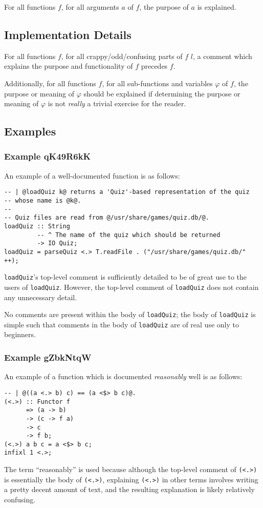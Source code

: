 \documentclass{report}
\begin{document}
For all functions $f$, for all arguments $a$ of $f$, the purpose of $a$ is explained.
\subsection{Implementation Details}
For all functions $f$, for all crappy/odd/confusing parts of $f$ $l$, a comment which explains the purpose and functionality of $f$ precedes $f$.

Additionally, for all functions $f$, for all sub-functions and variables $\varphi$ of $f$, the purpose or meaning of $\varphi$ should be explained if determining the purpose or meaning of $\varphi$ is not \textit{really} a trivial exercise for the reader.
\subsection{Examples}
\subsubsection{Example qK49R6kK}
An example of a well-documented function is as follows:
\lstset{style=customhaskell}
\begin{lstlisting}
-- | @loadQuiz k@ returns a 'Quiz'-based representation of the quiz
-- whose name is @k@.
--
-- Quiz files are read from @/usr/share/games/quiz.db/@.
loadQuiz :: String
         -- ^ The name of the quiz which should be returned
         -> IO Quiz;
loadQuiz = parseQuiz <.> T.readFile . ("/usr/share/games/quiz.db/" ++);
\end{lstlisting}
\texttt{loadQuiz}'s top-level comment is sufficiently detailed to be of great use to the users of \texttt{loadQuiz}.  However, the top-level comment of \texttt{loadQuiz} does not contain any unnecessary detail.

No comments are present within the body of \texttt{loadQuiz}; the body of \texttt{loadQuiz} is simple such that comments in the body of \texttt{loadQuiz} are of real use only to beginners.
\subsubsection{Example gZbkNtqW}
An example of a function which is documented \textit{reasonably} well is as follows:
\begin{lstlisting}
-- | @((a <.> b) c) == (a <$> b c)@.
(<.>) :: Functor f
      => (a -> b)
      -> (c -> f a)
      -> c
      -> f b;
(<.>) a b c = a <$> b c;
infixl 1 <.>;
\end{lstlisting}
The term ``reasonably'' is used because although the top-level comment of \texttt{(<.>)} is essentially the body of \texttt{(<.>)}, explaining \texttt{(<.>)} in other terms involves writing a pretty decent amount of text, and the resulting explanation is likely relatively confusing.
\end{document}
